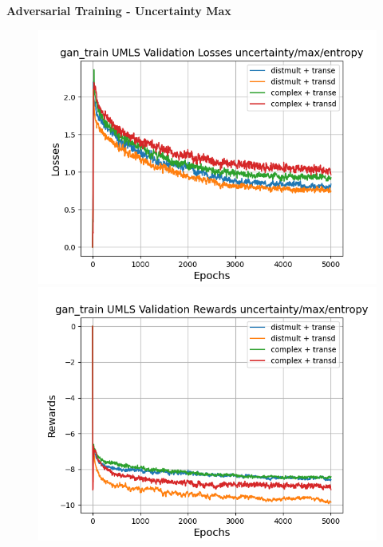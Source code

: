 \textbf{Adversarial Training - Uncertainty Max}\\
\begin{figure}
    \centering
    \begin{minipage}{.5\textwidth}
      \centering
      \includegraphics[width=0.9\linewidth]{figures/results/gan_train/pretrained/uncertainty/max/entropy/umls/gan_train_uncertainty_max_entropy_umls_losses.png}
    \end{minipage}%
    \begin{minipage}{.5\textwidth}
      \centering
      \includegraphics[width=0.9\linewidth]{figures/results/gan_train/pretrained/uncertainty/max/entropy/umls/gan_train_uncertainty_max_entropy_umls_rewards.png}
    \end{minipage}
    \begin{minipage}{.5\textwidth}
      \centering

\end{minipage}
\end{figure}

